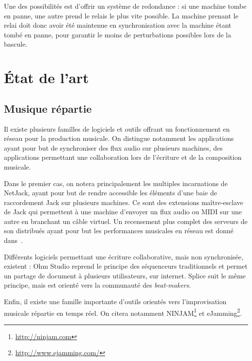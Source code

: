 \documentclass[10pt]{article}
\newcommand\trigger{point d'interaction\xspace}
\begin{document}
Une des possibilités est d'offrir un système de redondance : si une machine tombe en panne, une autre prend le relais le plus vite possible.
La machine prenant le relai doit donc avoir été maintenue en synchronisation avec la machine étant tombé en panne, pour garantir le moins de perturbations possibles lors de la bascule.
 

\section{État de l'art}
\subsection{Musique répartie}
Il existe plusieurs familles de logiciels et outils offrant un fonctionnement en réseau pour la production musicale.
On distingue notamment les applications ayant pour but de synchroniser des 
flux audio sur plusieurs machines, des applications permettant une collaboration lors 
de l'écriture et de la composition musicale.

Dans le premier cas, on notera principalement les multiples incarnations de NetJack\cite{carot2009netjack}, 
ayant pour but de rendre accessible les éléments d'une baie de raccordement Jack sur plusieurs machines. 
Ce sont des extensions maître-esclave de Jack qui permettent à une machine d'envoyer un flux audio ou MIDI sur une autre en branchant un câble virtuel.
Un recensement plus complet des serveurs de son distribués ayant pour but les performances musicales en réseau est donné dans~\cite{carot2007networked}. 

Différents logiciels permettant une écriture collaborative, mais non synchronisée, existent : 
Ohm Studio\cite{koszolko2015crowdsourcing} reprend le principe des séquenceurs traditionnels et permet un partage de document à plusieurs utilisateurs, sur internet.
Splice\cite{pignato2015deterritorialized} suit le même principe, mais est orienté vers la communauté des \emph{beat-makers}.

Enfin, il existe une famille importante d'outils orientés vers l'improvisation musicale répartie en temps réel\cite{mills2010dislocated}. 
On citera notamment NINJAM\footnote{\url{http://ninjam.com}} et eJamming\footnote{\url{http://www.ejamming.com/}}.
\end{document}
